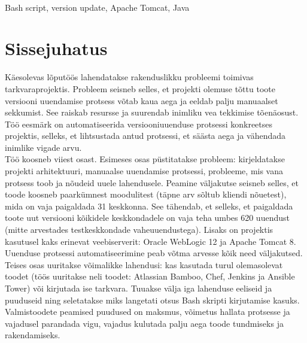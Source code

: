 \documentclass[12pt]{report}
\renewcommand{\headrulewidth}{0pt}
\begin{document}
  \\
  Bash script, version update, Apache Tomcat, Java
  
  \newpage
 
  \tableofcontents
  \fancypagestyle{plain}{%
    \renewcommand{\headrulewidth}{0pt}%
    \fancyhf{}%
    \fancyfoot[R]{\thepage}%
  }
 
  \newpage
  
  \section*{Sissejuhatus}
  \label{sissejuhatus}
  
  Käesolevas lõputöös lahendatakse rakenduslikku probleemi toimivas tarkvaraprojektis. Probleem seisneb selles, et projekti olemuse tõttu toote versiooni uuendamise protsess võtab kaua aega ja eeldab palju manuaalset sekkumist. See raiskab resursse ja suurendab inimliku vea tekkimise tõenäosust. Töö eesmärk on automatiseerida versiooniuuenduse protsessi konkreetses projektis, selleks, et lihtsustada antud protsessi, et säästa aega ja vähendada inimlike vigade arvu.\\
  
  Töö koosneb viiest osast. Esimeses osas püstitatakse probleem: kirjeldatakse projekti arhitektuuri, manuaalse uuendamise protsessi, probleeme, mis vana protsess toob ja nõudeid uuele lahendusele. Peamine väljakutse seisneb selles, et toode koosneb paarkümnest moodulitest (täpne arv sõltub kliendi nõuetest), mida on vaja paigaldada 31 keskkonna. See tähendab, et selleks, et paigaldada toote uut versiooni kõikidele keskkondadele on vaja teha umbes 620 uuendust (mitte arvestades testkeskkondade vaheuuendustega). Lisaks on projektis kasutusel kaks erinevat veebiserverit: Oracle WebLogic 12 ja Apache Tomcat 8. Uuenduse protsessi automatiseerimine peab võtma arvesse kõik need väljakutsed.\\
  
  Teises osas uuritakse võimalikke lahendusi: kas kasutada turul olemasolevat toodet (töös uuritakse neli toodet: Atlassian Bamboo, Chef, Jenkins ja Ansible Tower) või kirjutada ise tarkvara. Tuuakse välja iga lahenduse eeliseid ja puuduseid ning seletatakse miks langetati otsus Bash skripti kirjutamise kasuks. Valmistoodete peamised puudused on maksmus, võimetus hallata protsesse ja vajadusel parandada vigu, vajadus kulutada palju aega toode tundmiseks ja rakendamiseks.\\
  
\end{document}
